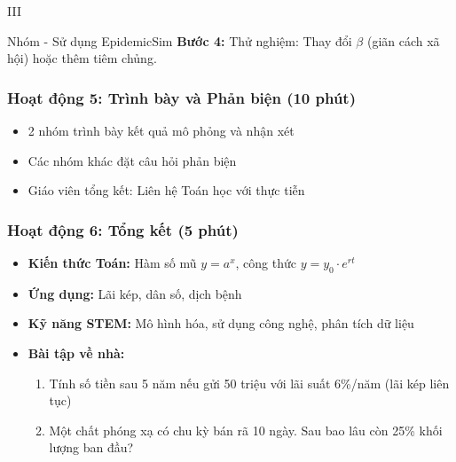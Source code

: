 \documentclass[12pt,a4paper]{article}
\begin{document}
\begin{competitionsection}{III}
\begin{task}{Nhóm - Sử dụng EpidemicSim}
\textbf{Bước 4:} Thử nghiệm: Thay đổi $\beta$ (giãn cách xã hội) hoặc thêm tiêm chủng.
\end{task}

\subsubsection*{Hoạt động 5: Trình bày và Phản biện (10 phút)}
\begin{itemize}[leftmargin=*,noitemsep]
\item 2 nhóm trình bày kết quả mô phỏng và nhận xét
\item Các nhóm khác đặt câu hỏi phản biện
\item Giáo viên tổng kết: Liên hệ Toán học với thực tiễn
\end{itemize}

\subsubsection*{Hoạt động 6: Tổng kết (5 phút)}
\begin{itemize}[leftmargin=*,noitemsep]
\item \textbf{Kiến thức Toán:} Hàm số mũ $y = a^x$, công thức $y = y_0 \cdot e^{rt}$
\item \textbf{Ứng dụng:} Lãi kép, dân số, dịch bệnh
\item \textbf{Kỹ năng STEM:} Mô hình hóa, sử dụng công nghệ, phân tích dữ liệu
\item \textbf{Bài tập về nhà:}
    \begin{enumerate}[leftmargin=*,noitemsep]
    \item Tính số tiền sau 5 năm nếu gửi 50 triệu với lãi suất 6\%/năm (lãi kép liên tục)
    \item Một chất phóng xạ có chu kỳ bán rã 10 ngày. Sau bao lâu còn 25\% khối lượng ban đầu?
    \end{enumerate}
\end{itemize}
\end{competitionsection}
\newpage
\end{document}
